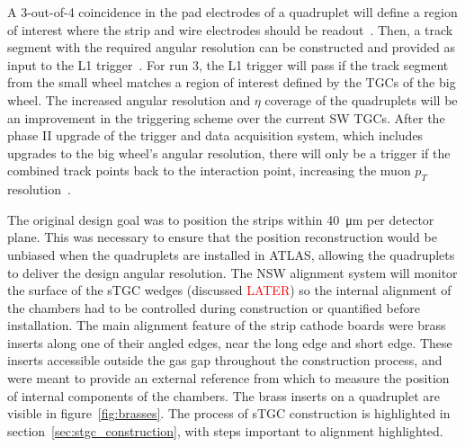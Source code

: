 A 3-out-of-4 coincidence in the pad electrodes of a quadruplet will define a region of interest where the strip and wire electrodes should be readout~\cite{nsw_tdr}. Then, a track segment with the required angular resolution can be constructed and provided as input to the L1 trigger~\cite{tdaq_phase1_tdr}. For run 3, the L1 trigger will pass if the track segment from the small wheel matches a region of interest defined by the TGCs of the big wheel. The increased angular resolution and $\eta$ coverage of the quadruplets will be an improvement in the triggering scheme over the current SW TGCs. After the phase II upgrade of the trigger and data acquisition system, which includes upgrades to the big wheel's angular resolution, there will only be a trigger if the combined track points back to the interaction point, increasing the muon $p_T$ resolution~\cite{tdaq_phase2_tdr}.

The original design goal was to position the strips within \SI{40}{\micro\meter} per detector plane. This was necessary to ensure that the position reconstruction would be unbiased when the quadruplets are installed in ATLAS, allowing the quadruplets to deliver the design angular resolution. The NSW alignment system will monitor the surface of the sTGC wedges (discussed \textcolor{red}{LATER}) so the internal alignment of the chambers had to be controlled during construction or quantified before installation. The main alignment feature of the strip cathode boards were brass inserts along one of their angled edges, near the long edge and short edge. These inserts accessible outside the gas gap throughout the construction process, and were meant to provide an external reference from which to measure the position of internal components of the chambers. The brass inserts on a quadruplet are visible in figure~\ref{fig:brasses}. The process of sTGC construction is highlighted in section~\ref{sec:stgc_construction}, with steps important to alignment highlighted.


